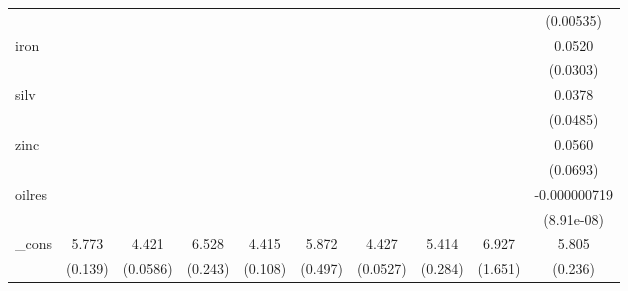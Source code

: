 {\begin{tabular}{l*{9}{c}}
            &                     &                     &                     &                     &                     &                     &                     &                     &   (0.00535)         \\
[1em]
iron        &                     &                     &                     &                     &                     &                     &                     &                     &      0.0520\sym{*}  \\
            &                     &                     &                     &                     &                     &                     &                     &                     &    (0.0303)         \\
[1em]
silv        &                     &                     &                     &                     &                     &                     &                     &                     &      0.0378         \\
            &                     &                     &                     &                     &                     &                     &                     &                     &    (0.0485)         \\
[1em]
zinc        &                     &                     &                     &                     &                     &                     &                     &                     &      0.0560         \\
            &                     &                     &                     &                     &                     &                     &                     &                     &    (0.0693)         \\
[1em]
oilres      &                     &                     &                     &                     &                     &                     &                     &                     &-0.000000719\sym{***}\\
            &                     &                     &                     &                     &                     &                     &                     &                     &  (8.91e-08)         \\
[1em]
\_cons      &       5.773\sym{***}&       4.421\sym{***}&       6.528\sym{***}&       4.415\sym{***}&       5.872\sym{***}&       4.427\sym{***}&       5.414\sym{***}&       6.927\sym{***}&       5.805\sym{***}\\
            &     (0.139)         &    (0.0586)         &     (0.243)         &     (0.108)         &     (0.497)         &    (0.0527)         &     (0.284)         &     (1.651)         &     (0.236)         \\

\end{tabular}}
